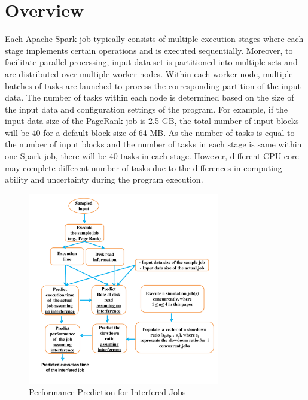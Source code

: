 \section{Overview}
\label{overview}

\noindent
Each Apache Spark job typically consists of multiple execution stages where each stage implements certain operations and is executed sequentially. Moreover, to facilitate parallel processing, input data set is partitioned into multiple sets and are distributed over multiple worker nodes. Within each worker node, multiple batches of tasks are launched to process the corresponding partition of the input data. The number of tasks within each node is determined based on the size of the input data and configuration settings of the program. For example, if the input data size of the PageRank job is 2.5 GB, the total number of input blocks will be 40 for a default block size of 64 MB. As the number of tasks is equal to the number of input blocks and the number of tasks in each stage is same within one Spark job, there will be 40 tasks in each stage. However, different CPU core may complete different number of tasks due to the differences in computing ability and uncertainty during the program execution. 
\begin{figure}[!t]
\centering
\includegraphics[width=3.3in]{flow1.pdf}
\caption{Performance Prediction for Interfered Jobs}
\label{flow}
\end{figure}

